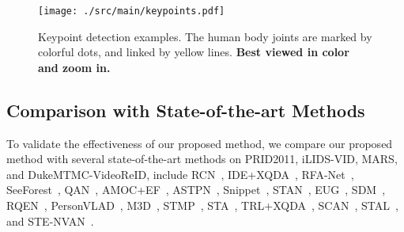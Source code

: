 \documentclass[journal]{IEEEtran}
\let\MYoriglatexcaption\caption
\renewcommand{\caption}[2][\relax]{\MYoriglatexcaption[#2]{#2}}
\begin{document}
\begin{figure}[t]
    \centering
    \texttt{[image: ./src/main/keypoints.pdf]}
    \caption{Keypoint detection examples. The human body joints are marked by colorful dots, and linked by yellow lines. \textbf{Best viewed in color and zoom in.}}
    \label{fig:keypoints}
\end{figure}

\subsection{Comparison with State-of-the-art Methods}
To validate the effectiveness of our proposed method, we compare our proposed method with several state-of-the-art methods on PRID2011, iLIDS-VID, MARS, and DukeMTMC-VideoReID, include RCN~\cite{McLaughlin_2016_CVPR}, IDE+XQDA~\cite{Zheng_2016_ECCV}, RFA-Net~\cite{Yan_2016_ECCV}, SeeForest~\cite{Zhou_2017_CVPR}, QAN~\cite{Liu_2017_CVPR}, AMOC+EF~\cite{Liu_2017_TCSVT}, ASTPN~\cite{Xu_2017_ICCV}, Snippet~\cite{Chen_2018_CVPR}, STAN~\cite{Li_2018_CVPR}, EUG~\cite{Wu_2018_CVPR}, SDM~\cite{Zhang_2018_CVPR}, RQEN~\cite{Song_2018_AAAI}, PersonVLAD~\cite{Wu_2019_TNNLS}, M3D~\cite{Li_2019_AAAI}, STMP~\cite{Liu_2019_AAAI}, STA~\cite{Fu_2019_AAAI}, TRL+XQDA~\cite{Dai_2018_TIP}, SCAN~\cite{Zhang_2019_TIP}, STAL~\cite{Chen_2019_TIP}, and STE-NVAN~\cite{Liu_2019_BMVC}.
\end{document}
